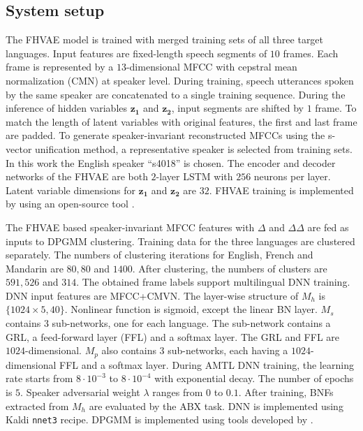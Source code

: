 \documentclass[a4paper]{article}
\begin{document}
\subsection{System setup}
\label{subsec:baseline}
The FHVAE model is trained with merged training sets of all three target languages.
Input features are fixed-length speech segments of $10$ frames. Each frame is represented by a $13$-dimensional MFCC with cepstral mean normalization (CMN) at speaker level. During training, speech utterances spoken by the same speaker are concatenated to a single training sequence. During the inference of hidden variables $\bm{z_1}$ and $\bm{z_2}$, input segments are shifted by $1$ frame. To match the length of latent variables with original features, the first and last frame are padded. 
To generate speaker-invariant reconstructed MFCCs using  the s-vector unification method, a representative speaker  is selected from training sets. In this work the English speaker ``s4018'' is chosen. The encoder and decoder networks of the FHVAE are both $2$-layer LSTM with $256$ neurons per layer. Latent variable dimensions for $\bm{z_1}$ and $\bm{z_2}$ are $32$. FHVAE  training is implemented by using an open-source tool \cite{hsu2017nips}.

The FHVAE based speaker-invariant MFCC features with $\Delta$ and $\Delta\Delta$ are fed as inputs to DPGMM clustering. Training data for the three languages are clustered separately. The numbers of clustering iterations for English, French and Mandarin are $80, 80$ and $1400$. After clustering, the numbers of clusters are $591, 526$ and $314$. 
The obtained frame  labels support multilingual DNN training.
DNN input features are MFCC+CMVN. The layer-wise structure  of   $M_h$ is $\{1024\times 5, 40\}$. Nonlinear function is sigmoid, except the linear BN layer. $M_s$ contains $3$ sub-networks, 
one for each language.
The sub-network contains a GRL, a feed-forward layer (FFL) and a softmax layer. The GRL and FFL are $1024$-dimensional. $M_p$ also contains $3$ sub-networks, each having a $1024$-dimensional FFL and a softmax layer.
During AMTL DNN training, the learning rate starts from $8\cdot 10^{-3}$ to $8\cdot 10^{-4}$ with exponential decay. The number of epochs is $5$. 
Speaker adversarial weight $\lambda$ ranges from $0$ to $0.1$. 
After training, BNFs extracted from $M_h$ are evaluated by the ABX task.
DNN is implemented using Kaldi \cite{povey2011kaldi} \texttt{nnet3} recipe. DPGMM is implemented using tools developed by \cite{chang2013parallel}.
\end{document}
